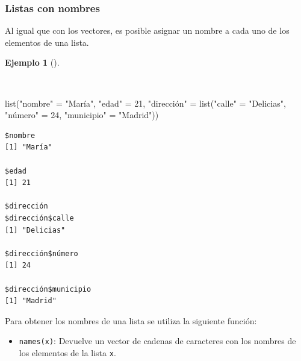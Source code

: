 \documentclass[
  a4paper,
]{scrreport}
\newenvironment{Shaded}{\begin{snugshade}}{\end{snugshade}}
\newcommand{\DecValTok}[1]{\textcolor[rgb]{0.68,0.00,0.00}{#1}}
\newcommand{\FunctionTok}[1]{\textcolor[rgb]{0.28,0.35,0.67}{#1}}
\newcommand{\NormalTok}[1]{\textcolor[rgb]{0.00,0.23,0.31}{#1}}
\newcommand{\OtherTok}[1]{\textcolor[rgb]{0.00,0.23,0.31}{#1}}
\newcommand{\StringTok}[1]{\textcolor[rgb]{0.13,0.47,0.30}{#1}}
\providecommand{\tightlist}{%
  \setlength{\itemsep}{0pt}\setlength{\parskip}{0pt}}\usepackage{longtable,booktabs,array}
\theoremstyle{definition}
\theoremstyle{definition}
\newtheorem{example}{Ejemplo}[chapter]
\theoremstyle{remark}
\begin{document}
\hypertarget{listas-con-nombres}{%
\subsubsection{Listas con nombres}\label{listas-con-nombres}}

Al igual que con los vectores, es posible asignar un nombre a cada uno
de los elementos de una lista.

\begin{example}[]\protect\hypertarget{exm-creacion-listas-nombres}{}\label{exm-creacion-listas-nombres}

~

\begin{Shaded}
\begin{Highlighting}[]
\FunctionTok{list}\NormalTok{(}\StringTok{"nombre"} \OtherTok{=} \StringTok{"María"}\NormalTok{, }\StringTok{"edad"} \OtherTok{=} \DecValTok{21}\NormalTok{, }\StringTok{"dirección"} \OtherTok{=} \FunctionTok{list}\NormalTok{(}\StringTok{"calle"} \OtherTok{=} \StringTok{"Delicias"}\NormalTok{, }\StringTok{"número"} \OtherTok{=} \DecValTok{24}\NormalTok{, }\StringTok{"municipio"} \OtherTok{=} \StringTok{"Madrid"}\NormalTok{))}
\end{Highlighting}
\end{Shaded}

\begin{verbatim}
$nombre
[1] "María"

$edad
[1] 21

$dirección
$dirección$calle
[1] "Delicias"

$dirección$número
[1] 24

$dirección$municipio
[1] "Madrid"
\end{verbatim}

\end{example}

Para obtener los nombres de una lista se utiliza la siguiente función:

\begin{itemize}
\tightlist
\item
  \texttt{names(x)}: Devuelve un vector de cadenas de caracteres con los
  nombres de los elementos de la lista \texttt{x}.
\end{itemize}
\end{document}
